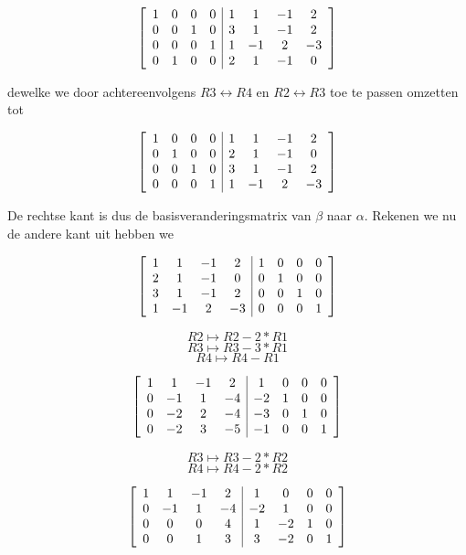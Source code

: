 \documentclass[lineaire_algebra_oplossingen.tex]{subfiles}
\begin{document}
\[
\left[
\begin{array}{ c c c c | c c c c }
1 & 0 & 0 & 0 & 1 & 1 & -1 & 2\\
0 & 0 & 1 & 0 & 3 & 1 & -1 & 2\\
0 & 0 & 0 & 1 & 1 & -1 & 2 & -3\\
0 & 1 & 0 & 0 & 2 & 1 & -1 & 0
\end{array}
\right]
\]

dewelke we door achtereenvolgens $R3 \leftrightarrow R4$ en $R2 \leftrightarrow R3$ toe te passen omzetten tot

\[
\left[
\begin{array}{ c c c c | c c c c }
1 & 0 & 0 & 0 & 1 & 1 & -1 & 2\\
0 & 1 & 0 & 0 & 2 & 1 & -1 & 0\\
0 & 0 & 1 & 0 & 3 & 1 & -1 & 2\\
0 & 0 & 0 & 1 & 1 & -1 & 2 & -3
\end{array}
\right]
\]

De rechtse kant is dus de basisveranderingsmatrix van $\beta$ naar $\alpha$. Rekenen we nu de andere kant uit hebben we

\[
\left[
\begin{array}{ c c c c | c c c c }
1 & 1 & -1 & 2 & 1 & 0 & 0 & 0\\
2 & 1 & -1 & 0 & 0 & 1 & 0 & 0\\
3 & 1 & -1 & 2 & 0 & 0 & 1 & 0\\
1 & -1 & 2 & -3 & 0 & 0 & 0 & 1
\end{array}
\right]
\]

\[R2 \mapsto R2 - 2*R1 \]
\[R3 \mapsto R3 - 3*R1 \]
\[R4 \mapsto R4 - R1 \]

\[
\left[
\begin{array}{ c c c c | c c c c }
1 & 1 & -1 & 2 & 1 & 0 & 0 & 0\\
0 & -1 & 1 & -4 & -2 & 1 & 0 & 0\\
0 & -2 & 2 & -4 & -3 & 0 & 1 & 0\\
0 & -2 & 3 & -5 & -1 & 0 & 0 & 1
\end{array}
\right]
\]

\[R3 \mapsto R3 - 2*R2 \]
\[R4 \mapsto R4 - 2*R2 \]

\[
\left[
\begin{array}{ c c c c | c c c c }
1 & 1 & -1 & 2 & 1 & 0 & 0 & 0\\
0 & -1 & 1 & -4 & -2 & 1 & 0 & 0\\
0 & 0 & 0 & 4 & 1 & -2 & 1 & 0\\
0 & 0 & 1 & 3 & 3 & -2 & 0 & 1
\end{array}
\right]
\]
\end{document}
